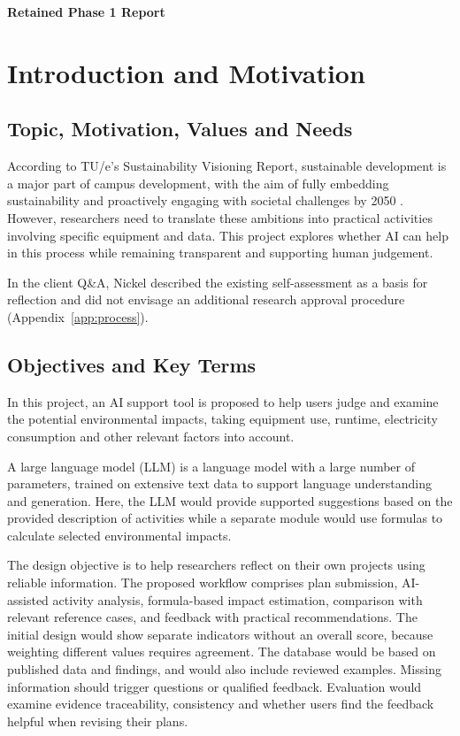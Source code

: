 \documentclass[11pt,a4paper]{article}
\begin{document}


\clearpage
\begin{center}\large\bfseries Retained Phase 1 Report\end{center}
\section{Introduction and Motivation}

\subsection{Topic, Motivation, Values and Needs}
According to TU/e's Sustainability Visioning Report, sustainable development is a major part of campus development, with the aim of fully embedding sustainability and proactively engaging with societal challenges by 2050 \citep{tue_sustainability_2021}. However, researchers need to translate these ambitions into practical activities involving specific equipment and data. This project explores whether AI can help in this process while remaining transparent and supporting human judgement.

In the client Q\&A, Nickel described the existing self-assessment as a basis for reflection and did not envisage an additional research approval procedure (Appendix~\ref{app:process}).

\subsection{Objectives and Key Terms}
In this project, an AI support tool is proposed to help users judge and examine the potential environmental impacts, taking equipment use, runtime, electricity consumption and other relevant factors into account.

A large language model (LLM) is a language model with a large number of parameters, trained on extensive text data to support language understanding and generation. Here, the LLM would provide supported suggestions based on the provided description of activities while a separate module would use formulas to calculate selected environmental impacts.

The design objective is to help researchers reflect on their own projects using reliable information. The proposed workflow comprises plan submission, AI-assisted activity analysis, formula-based impact estimation, comparison with relevant reference cases, and feedback with practical recommendations. The initial design would show separate indicators without an overall score, because weighting different values requires agreement. The database would be based on published data and findings, and would also include reviewed examples. Missing information should trigger questions or qualified feedback. Evaluation would examine evidence traceability, consistency and whether users find the feedback helpful when revising their plans.
\end{document}
